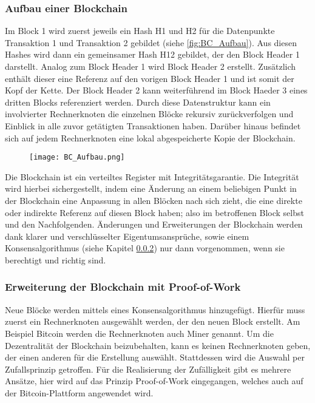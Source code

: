 \subsubsection{Aufbau einer Blockchain}
Im Block 1 wird zuerst jeweils ein Hash H1 und H2 für die Datenpunkte Transaktion 1 
und Transaktion 2 gebildet (siehe \autoref{fig:BC_Aufbau}). Aus diesen Hashes wird dann ein gemeinsamer Hash H12 gebildet, 
der den Block Header 1 darstellt.
Analog zum Block Header 1 wird Block Header 2 erstellt. Zusätzlich enthält dieser eine
Referenz auf den vorigen Block Header 1 und ist somit der Kopf der Kette. Der Block Header 2
kann weiterführend im Block Haeder 3 eines dritten Blocks referenziert werden. 
Durch diese Datenstruktur kann ein involvierter Rechnerknoten die einzelnen Blöcke rekursiv
zurückverfolgen und Einblick in alle zuvor getätigten Transaktionen haben. Darüber
hinaus befindet sich auf jedem Rechnerknoten eine lokal abgespeicherte Kopie der 
Blockchain.
\cite[p.~17f]{fill2020blockchain}

\begin{figure}[h]
    \begin{center}
        \texttt{[image: BC\_Aufbau.png]}
    \end{center}
    \label{fig:BC_Aufbau}
\end{figure}

Die Blockchain ist  ein verteiltes Register mit Integritätsgarantie. Die Integrität 
wird hierbei sichergestellt, indem eine Änderung an einem beliebigen Punkt in der
Blockchain eine Anpassung in allen Blöcken nach sich zieht, die eine direkte oder
indirekte Referenz auf diesen Block haben; also im betroffenen Block selbst und den
Nachfolgenden. Änderungen und Erweiterungen der Blockchain werden dank klarer 
und verschlüsselter Eigentumsansprüche, sowie einem Konsensalgorithmus (siehe Kapitel \ref{sec:Erweiterung})
nur dann vorgenommen, wenn sie berechtigt und richtig sind.
\cite[p.~22]{fill2020blockchain} 

\subsubsection{Erweiterung der Blockchain mit Proof-of-Work}
\label{sec:Erweiterung}
Neue Blöcke werden mittels eines Konsensalgorithmus hinzugefügt.
Hierfür muss zuerst ein Rechnerknoten ausgewählt werden, der den neuen Block erstellt. 
Am Beispiel Bitcoin werden die Rechnerknoten auch \glqq Miner\grqq{} genannt.
Um die Dezentralität der Blockchain beizubehalten, kann es keinen Rechnerknoten geben, der einen 
anderen für die Erstellung auswählt. Stattdessen wird die Auswahl per Zufallsprinzip getroffen.
Für die Realisierung der Zufälligkeit gibt es mehrere Ansätze, hier wird auf das
Prinzip \glqq Proof-of-Work\grqq{} eingegangen, welches auch auf der Bitcoin-Plattform angewendet wird.

